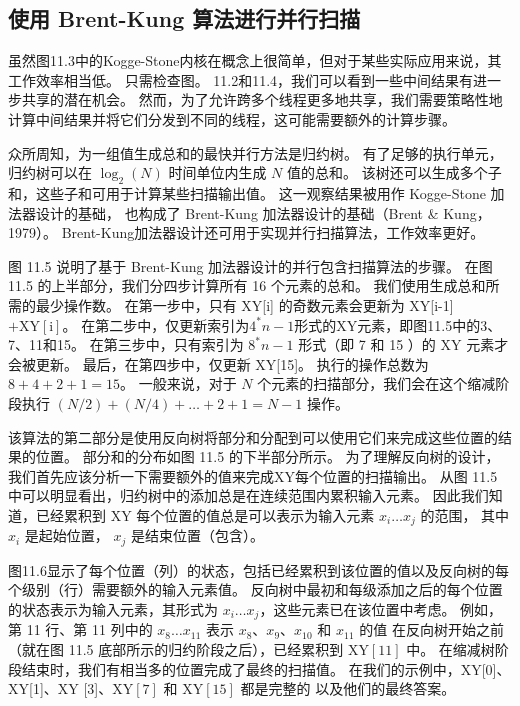 \subsection{使用 Brent-Kung 算法进行并行扫描}
虽然图11.3中的Kogge-Stone内核在概念上很简单，但对于某些实际应用来说，其工作效率相当低。 
只需检查图。 11.2和11.4，我们可以看到一些中间结果有进一步共享的潜在机会。 
然而，为了允许跨多个线程更多地共享，我们需要策略性地计算中间结果并将它们分发到不同的线程，这可能需要额外的计算步骤。

众所周知，为一组值生成总和的最快并行方法是归约树。 
有了足够的执行单元，归约树可以在 $\log_{2}(N)$ 时间单位内生成 $N$ 值的总和。 
该树还可以生成多个子和，这些子和可用于计算某些扫描输出值。 
这一观察结果被用作 Kogge-Stone 加法器设计的基础，
也构成了 Brent-Kung 加法器设计的基础（Brent \& Kung，1979）。 
Brent-Kung加法器设计还可用于实现并行扫描算法，工作效率更好。

图 11.5 说明了基于 Brent-Kung 加法器设计的并行包含扫描算法的步骤。 
在图 11.5 的上半部分，我们分四步计算所有 16 个元素的总和。 我们使用生成总和所需的最少操作数。 
在第一步中，只有 XY[i] 的奇数元素会更新为 XY[i-1] $+\mathrm{XY}[\mathrm{i}]$。 
在第二步中，仅更新索引为$4^{*} n-1$形式的XY元素，即图11.5中的3、7、11和15。 
在第三步中，只有索引为 $8^{*} n-1$ 形式（即 7 和 15 ）的 XY 元素才会被更新。 
最后，在第四步中，仅更新 XY[15]。 执行的操作总数为$8+4+2+1=15$。 
一般来说，对于 $N$ 个元素的扫描部分，我们会在这个缩减阶段执行 $(N / 2)+(N / 4)+\ldots+2+1=N-1$ 操作。

该算法的第二部分是使用反向树将部分和分配到可以使用它们来完成这些位置的结果的位置。 
部分和的分布如图 11.5 的下半部分所示。 为了理解反向树的设计，我们首先应该分析一下需要额外的值来完成XY每个位置的扫描输出。 
从图 11.5 中可以明显看出，归约树中的添加总是在连续范围内累积输入元素。 
因此我们知道，已经累积到 XY 每个位置的值总是可以表示为输入元素 $x_{i} \ldots x_{j}$ 的范围，
其中 $x_{i}$ 是起始位置， $x_{j}$ 是结束位置（包含）。

图11.6显示了每个位置（列）的状态，包括已经累积到该位置的值以及反向树的每个级别（行）需要额外的输入元素值。 
反向树中最初和每级添加之后的每个位置的状态表示为输入元素，其形式为 $x_{i} \ldots x_{j}$，这些元素已在该位置中考虑。 
例如，第 11 行、第 11 列中的 $x_{8} \ldots x_{11}$ 表示 $x_{8}、x_{9}、x_{10}$ 和 $x_{11}$ 的值 在反向树开始之前（就在图 11.5 底部所示的归约阶段之后），已经累积到 $\mathrm{XY}[11]$ 中。 
在缩减树阶段结束时，我们有相当多的位置完成了最终的扫描值。 
在我们的示例中，XY[0]、XY[1]、$\mathrm{XY}$ [3]、$\mathrm{XY}[7]$ 和 $\mathrm{XY}[15]$ 都是完整的 以及他们的最终答案。

